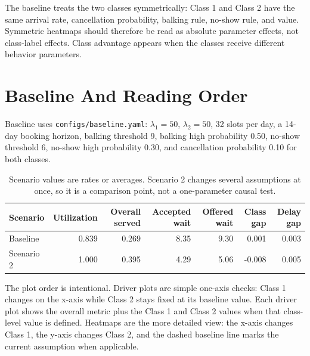 \documentclass[11pt]{article}
\begin{document}
The baseline treats the two classes symmetrically: Class 1 and Class 2 have the same arrival rate, cancellation probability, balking rule, no-show rule, and value. Symmetric heatmaps should therefore be read as absolute parameter effects, not class-label effects. Class advantage appears when the classes receive different behavior parameters.

\section{Baseline And Reading Order}

Baseline uses \texttt{configs/baseline.yaml}: $\lambda_1 = 50$, $\lambda_2 = 50$, 32 slots per day, a 14-day booking horizon, balking threshold 9, balking high probability 0.50, no-show threshold 6, no-show high probability 0.30, and cancellation probability 0.10 for both classes.

\begin{table}[H]
\centering
\begin{tabular}{lrrrrrr}
\toprule
Scenario & Utilization & Overall served & Accepted wait & Offered wait & Class gap & Delay gap \\
\midrule
Baseline & 0.839 & 0.269 & 8.35 & 9.30 & 0.001 & 0.003 \\
Scenario 2 & 1.000 & 0.395 & 4.29 & 5.06 & -0.008 & 0.005 \\
\bottomrule
\end{tabular}
\caption{Scenario values are rates or averages. Scenario 2 changes several assumptions at once, so it is a comparison point, not a one-parameter causal test.}
\end{table}

The plot order is intentional. Driver plots are simple one-axis checks: Class 1 changes on the x-axis while Class 2 stays fixed at its baseline value. Each driver plot shows the overall metric plus the Class 1 and Class 2 values when that class-level value is defined. Heatmaps are the more detailed view: the x-axis changes Class 1, the y-axis changes Class 2, and the dashed baseline line marks the current assumption when applicable.
\end{document}
